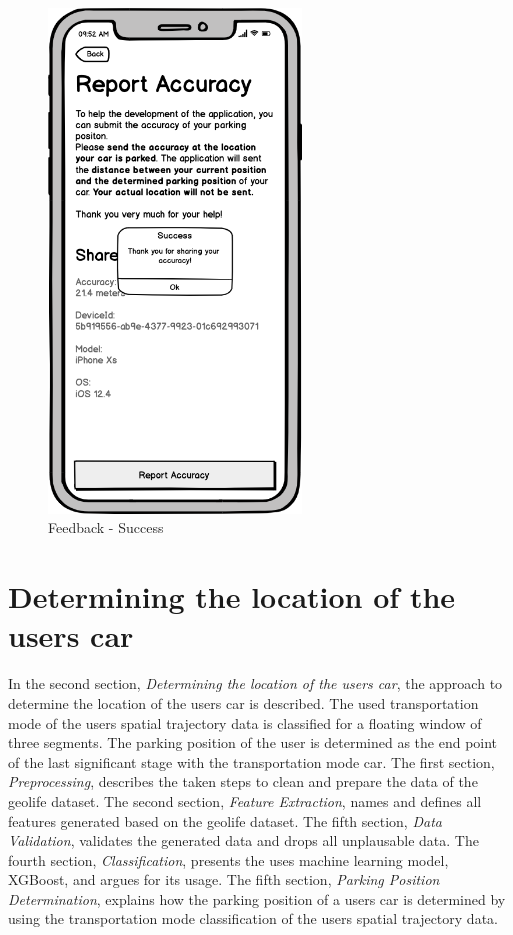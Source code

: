 \begin{figure}[h]
\begin{minipage}[b]{0.49\textwidth}
    \includegraphics[width=0.6\textwidth]{images/UI/Iteration4-Feedback-Success.png}
    \caption{Feedback - Success}
    \label{fig:feedback-succ}
  \end{minipage}
\end{figure}

\section{Determining the location of the users car}
In the second section, \textit{Determining the location of the users car}, the approach to determine the location of the users car is described. The used transportation mode of the users spatial trajectory data is classified for a floating window of three segments. The parking position of the user is determined as the end point of the last significant stage with the transportation mode car.
The first section, \textit{Preprocessing}, describes the taken steps to clean and prepare the data of the geolife dataset.
The second section, \textit{Feature Extraction}, names and defines all features generated based on the geolife dataset.
The fifth section, \textit{Data Validation}, validates the generated data and drops all unplausable data.
The fourth section, \textit{Classification}, presents the uses machine learning model, XGBoost, and argues for its usage.
The fifth section, \textit{Parking Position Determination}, explains how the parking position of a users car is determined by using the transportation mode classification of the users spatial trajectory data.

